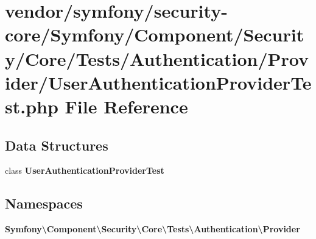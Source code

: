 \section{vendor/symfony/security-\/core/\+Symfony/\+Component/\+Security/\+Core/\+Tests/\+Authentication/\+Provider/\+User\+Authentication\+Provider\+Test.php File Reference}
\label{_user_authentication_provider_test_8php}
\subsection*{Data Structures}
\begin{DoxyCompactItemize}
\item 
class {\bf User\+Authentication\+Provider\+Test}
\end{DoxyCompactItemize}
\subsection*{Namespaces}
\begin{DoxyCompactItemize}
\item 
 {\bf Symfony\textbackslash{}\+Component\textbackslash{}\+Security\textbackslash{}\+Core\textbackslash{}\+Tests\textbackslash{}\+Authentication\textbackslash{}\+Provider}
\end{DoxyCompactItemize}
